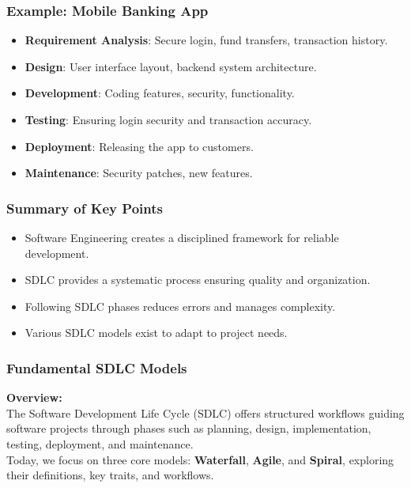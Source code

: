 \documentclass{beamer}
\begin{document}
\begin{frame}[fragile]
    \frametitle{Example: Mobile Banking App}
    \begin{itemize}
        \item \textbf{Requirement Analysis}: Secure login, fund transfers, transaction history.
        \item \textbf{Design}: User interface layout, backend system architecture.
        \item \textbf{Development}: Coding features, security, functionality.
        \item \textbf{Testing}: Ensuring login security and transaction accuracy.
        \item \textbf{Deployment}: Releasing the app to customers.
        \item \textbf{Maintenance}: Security patches, new features.
    \end{itemize}
\end{frame}

\begin{frame}[fragile]
    \frametitle{Summary of Key Points}
    \begin{itemize}
        \item Software Engineering creates a disciplined framework for reliable development.
        \item SDLC provides a systematic process ensuring quality and organization.
        \item Following SDLC phases reduces errors and manages complexity.
        \item Various SDLC models exist to adapt to project needs.
    \end{itemize}
\end{frame}

\begin{frame}[fragile]
  \frametitle{Fundamental SDLC Models}
  \textbf{Overview:} \\
  The Software Development Life Cycle (SDLC) offers structured workflows guiding software projects through phases such as planning, design, implementation, testing, deployment, and maintenance. 
  \\
  Today, we focus on three core models: \textbf{Waterfall}, \textbf{Agile}, and \textbf{Spiral}, exploring their definitions, key traits, and workflows.
\end{frame}
\end{document}
